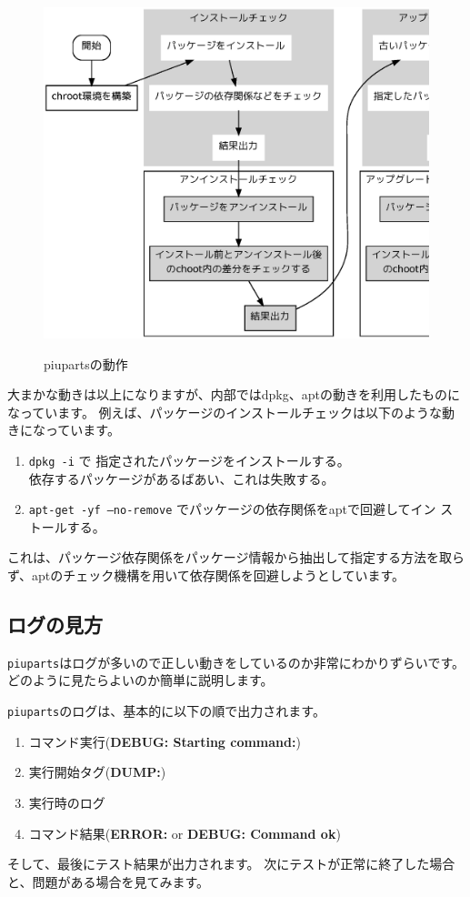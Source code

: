 \documentclass[mingoth,a4paper]{jsarticle}
\begin{document}
\begin{figure}[H]
\caption{piupartsの動作}
\begin{center}
\includegraphics[height=0.8\hsize]{image201004/piuparts-process.eps}
\label{fig:piuparts-process}
\end{center}
\end{figure}

大まかな動きは以上になりますが、内部ではdpkg、aptの動きを利用したものに
なっています。
例えば、パッケージのインストールチェックは以下のような動きになっています。
\begin{enumerate}
\item \texttt{dpkg -i} で 指定されたパッケージをインストールする。\\
依存するパッケージがあるばあい、これは失敗する。
\item \texttt{apt-get -yf --no-remove} でパッケージの依存関係をaptで回避してイン
      ストールする。
\end{enumerate}
これは、パッケージ依存関係をパッケージ情報から抽出して指定する方法を取ら
ず、aptのチェック機構を用いて依存関係を回避しようとしています。

\subsection{ログの見方}
\texttt{piuparts}はログが多いので正しい動きをしているのか非常にわかりずらいです。
どのように見たらよいのか簡単に説明します。

\texttt{piuparts}のログは、基本的に以下の順で出力されます。
\begin{enumerate}
\item コマンド実行({\bf DEBUG: Starting command:})
\item 実行開始タグ({\bf DUMP:})
\item 実行時のログ
\item コマンド結果({\bf ERROR:} or {\bf DEBUG: Command ok})
\end{enumerate}
そして、最後にテスト結果が出力されます。
次にテストが正常に終了した場合と、問題がある場合を見てみます。
\end{document}
